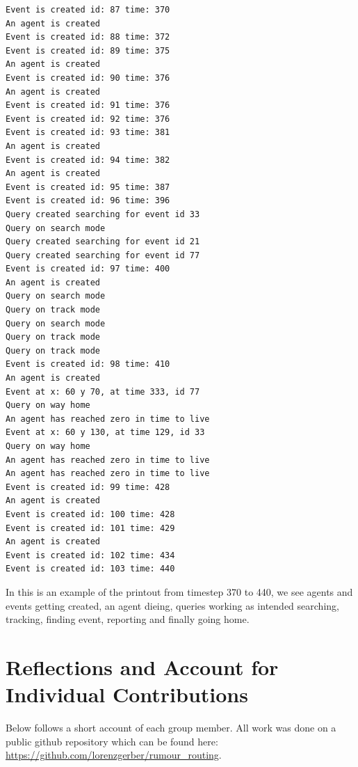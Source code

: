 \documentclass[a4paper,11pt,twoside]{article}
\begin{document}
\begin{verbatim}
Event is created id: 87 time: 370
An agent is created
Event is created id: 88 time: 372
Event is created id: 89 time: 375
An agent is created
Event is created id: 90 time: 376
An agent is created
Event is created id: 91 time: 376
Event is created id: 92 time: 376
Event is created id: 93 time: 381
An agent is created
Event is created id: 94 time: 382
An agent is created
Event is created id: 95 time: 387
Event is created id: 96 time: 396
Query created searching for event id 33
Query on search mode
Query created searching for event id 21
Query created searching for event id 77
Event is created id: 97 time: 400
An agent is created
Query on search mode
Query on track mode
Query on search mode
Query on track mode
Query on track mode
Event is created id: 98 time: 410
An agent is created
Event at x: 60 y 70, at time 333, id 77
Query on way home
An agent has reached zero in time to live
Event at x: 60 y 130, at time 129, id 33
Query on way home
An agent has reached zero in time to live
An agent has reached zero in time to live
Event is created id: 99 time: 428
An agent is created
Event is created id: 100 time: 428
Event is created id: 101 time: 429
An agent is created
Event is created id: 102 time: 434
Event is created id: 103 time: 440
\end{verbatim}

In this is an example of the printout from timestep 370 to 440, we see
agents and events getting created, an agent dieing, queries working as
intended searching, tracking, finding event, reporting and finally
going home.


\section{Reflections and Account for Individual Contributions}
Below follows a short account of each group member. All work was done
on a public github repository which can be found here: 
\url{https://github.com/lorenzgerber/rumour_routing}.
\end{document}
